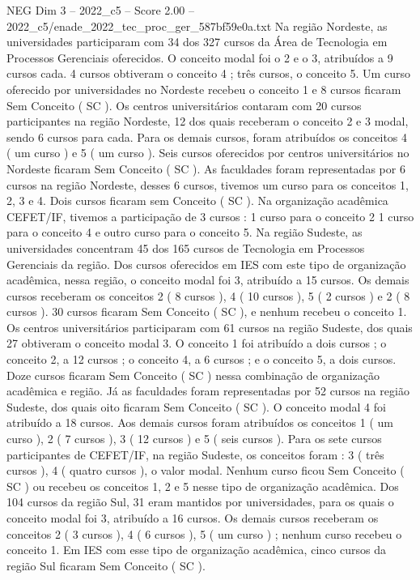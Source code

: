 \begin{textsample}{NEG Dim 3 – 2022\_c5 – Score 2.00 – 2022\_c5/enade\_2022\_tec\_proc\_ger\_587bf59e0a.txt}
Na região Nordeste, as universidades participaram com 34 dos 327 cursos da Área de Tecnologia em Processos Gerenciais oferecidos.
O conceito modal foi o 2 e o 3, atribuídos a 9 cursos cada. 4 cursos obtiveram o conceito 4 ; três cursos, o conceito 5.
Um curso oferecido por universidades no Nordeste recebeu o conceito 1 e 8 cursos ficaram Sem Conceito ( SC ).
Os centros universitários contaram com 20 cursos participantes na região Nordeste, 12 dos quais receberam o conceito 2 e 3 modal, sendo 6 cursos para cada.
Para os demais cursos, foram atribuídos os conceitos 4 ( um curso ) e 5 ( um curso ).
Seis cursos oferecidos por centros universitários no Nordeste ficaram Sem Conceito ( SC ).
As faculdades foram representadas por 6 cursos na região Nordeste, desses 6 cursos, tivemos um curso para os conceitos 1, 2, 3 e 4.
Dois cursos ficaram sem Conceito ( SC ).
Na organização acadêmica CEFET/IF, tivemos a participação de 3 cursos : 1 curso para o conceito 2 1 curso para o conceito 4 e outro curso para o conceito 5.
Na região Sudeste, as universidades concentram 45 dos 165 cursos de Tecnologia em Processos Gerenciais da região.
Dos cursos oferecidos em IES com este tipo de organização acadêmica, nessa região, o conceito modal foi 3, atribuído a 15 cursos.
Os demais cursos receberam os conceitos 2 ( 8 cursos ), 4 ( 10 cursos ), 5 ( 2 cursos ) e 2 ( 8 cursos ). 30 cursos ficaram Sem Conceito ( SC ), e nenhum recebeu o conceito 1.
Os centros universitários participaram com 61 cursos na região Sudeste, dos quais 27 obtiveram o conceito modal 3.
O conceito 1 foi atribuído a dois cursos ; o conceito 2, a 12 cursos ; o conceito 4, a 6 cursos ; e o conceito 5, a dois cursos.
Doze cursos ficaram Sem Conceito ( SC ) nessa combinação de organização acadêmica e região.
Já as faculdades foram representadas por 52 cursos na região Sudeste, dos quais oito ficaram Sem Conceito ( SC ).
O conceito modal 4 foi atribuído a 18 cursos.
Aos demais cursos foram atribuídos os conceitos 1 ( um curso ), 2 ( 7 cursos ), 3 ( 12 cursos ) e 5 ( seis cursos ).
Para os sete cursos participantes de CEFET/IF, na região Sudeste, os conceitos foram : 3 ( três cursos ), 4 ( quatro cursos ), o valor modal.
Nenhum curso ficou Sem Conceito ( SC ) ou recebeu os conceitos 1, 2 e 5 nesse tipo de organização acadêmica.
Dos 104 cursos da região Sul, 31 eram mantidos por universidades, para os quais o conceito modal foi 3, atribuído a 16 cursos.
Os demais cursos receberam os conceitos 2 ( 3 cursos ), 4 ( 6 cursos ), 5 ( um curso ) ; nenhum curso recebeu o conceito 1.
Em IES com esse tipo de organização acadêmica, cinco cursos da região Sul ficaram Sem Conceito ( SC ).

\end{textsample}
